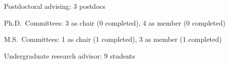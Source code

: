 \begin{veryTightItemize}
    \item Postdoctoral advising: 3 postdocs
    \item Ph.D.\ Committees: 3 as chair (0 completed), 4 as member (0 completed)
    \item M.S.\ Committees:  1 as chair (1 completed), 3 as member (1 completed)
    \item Undergraduate research advisor: 9 students
\end{veryTightItemize}
